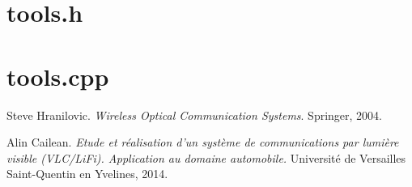 \documentclass[12pt]{report}
\begin{document}


\section{tools.h}



\section{tools.cpp}















\begin{thebibliography}{9}

Steve Hranilovic.
\textit{Wireless Optical Communication Systems}.
Springer, 2004.

Alin Cailean.
\textit{Etude et réalisation d’un système de communications par lumière visible (VLC/LiFi). Application au domaine automobile.}
Université de Versailles Saint-Quentin en Yvelines, 2014.

\end{thebibliography}
\end{document}

